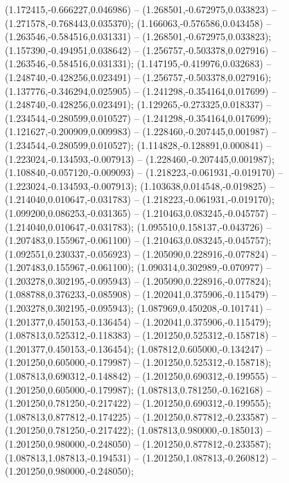  (1.172415,-0.666227,0.046986) -- (1.268501,-0.672975,0.033823) -- (1.271578,-0.768443,0.035370);
 (1.166063,-0.576586,0.043458) -- (1.263546,-0.584516,0.031331) -- (1.268501,-0.672975,0.033823);
 (1.157390,-0.494951,0.038642) -- (1.256757,-0.503378,0.027916) -- (1.263546,-0.584516,0.031331);
 (1.147195,-0.419976,0.032683) -- (1.248740,-0.428256,0.023491) -- (1.256757,-0.503378,0.027916);
 (1.137776,-0.346294,0.025905) -- (1.241298,-0.354164,0.017699) -- (1.248740,-0.428256,0.023491);
 (1.129265,-0.273325,0.018337) -- (1.234544,-0.280599,0.010527) -- (1.241298,-0.354164,0.017699);
 (1.121627,-0.200909,0.009983) -- (1.228460,-0.207445,0.001987) -- (1.234544,-0.280599,0.010527);
 (1.114828,-0.128891,0.000841) -- (1.223024,-0.134593,-0.007913) -- (1.228460,-0.207445,0.001987);
 (1.108840,-0.057120,-0.009093) -- (1.218223,-0.061931,-0.019170) -- (1.223024,-0.134593,-0.007913);
 (1.103638,0.014548,-0.019825) -- (1.214040,0.010647,-0.031783) -- (1.218223,-0.061931,-0.019170);
 (1.099200,0.086253,-0.031365) -- (1.210463,0.083245,-0.045757) -- (1.214040,0.010647,-0.031783);
 (1.095510,0.158137,-0.043726) -- (1.207483,0.155967,-0.061100) -- (1.210463,0.083245,-0.045757);
 (1.092551,0.230337,-0.056923) -- (1.205090,0.228916,-0.077824) -- (1.207483,0.155967,-0.061100);
 (1.090314,0.302989,-0.070977) -- (1.203278,0.302195,-0.095943) -- (1.205090,0.228916,-0.077824);
 (1.088788,0.376233,-0.085908) -- (1.202041,0.375906,-0.115479) -- (1.203278,0.302195,-0.095943);
 (1.087969,0.450208,-0.101741) -- (1.201377,0.450153,-0.136454) -- (1.202041,0.375906,-0.115479);
 (1.087813,0.525312,-0.118383) -- (1.201250,0.525312,-0.158718) -- (1.201377,0.450153,-0.136454);
 (1.087812,0.605000,-0.134247) -- (1.201250,0.605000,-0.179987) -- (1.201250,0.525312,-0.158718);
 (1.087813,0.690312,-0.148842) -- (1.201250,0.690312,-0.199555) -- (1.201250,0.605000,-0.179987);
 (1.087813,0.781250,-0.162168) -- (1.201250,0.781250,-0.217422) -- (1.201250,0.690312,-0.199555);
 (1.087813,0.877812,-0.174225) -- (1.201250,0.877812,-0.233587) -- (1.201250,0.781250,-0.217422);
 (1.087813,0.980000,-0.185013) -- (1.201250,0.980000,-0.248050) -- (1.201250,0.877812,-0.233587);
 (1.087813,1.087813,-0.194531) -- (1.201250,1.087813,-0.260812) -- (1.201250,0.980000,-0.248050);

